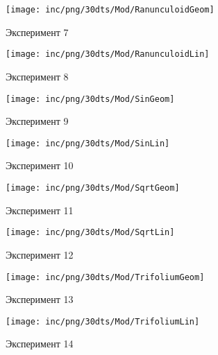 \begin{figure}  
	\begin{minipage}{0,5\textwidth}
		\texttt{[image: inc/png/30dts/Mod/RanunculoidGeom]}
		\label{fig:app1}
		\caption{Эксперимент 7}
	\end{minipage}
	\begin{minipage}{0,5\textwidth}
		\texttt{[image: inc/png/30dts/Mod/RanunculoidLin]}
		\label{fig:app2}
		\caption{Эксперимент 8}
	\end{minipage}
	
	\begin{minipage}{0,5\textwidth}
		\texttt{[image: inc/png/30dts/Mod/SinGeom]}
		\label{fig:app1}
		\caption{Эксперимент 9}
	\end{minipage}
	\begin{minipage}{0,5\textwidth}
		\texttt{[image: inc/png/30dts/Mod/SinLin]}
		\label{fig:app2}
		\caption{Эксперимент 10}
	\end{minipage}
	
	\begin{minipage}{0,5\textwidth}
		\texttt{[image: inc/png/30dts/Mod/SqrtGeom]}
		\label{fig:app1}
		\caption{Эксперимент 11}
	\end{minipage}
	\begin{minipage}{0,5\textwidth}
		\texttt{[image: inc/png/30dts/Mod/SqrtLin]}
		\label{fig:app2}
		\caption{Эксперимент 12}
	\end{minipage}
	
	\begin{minipage}{0,5\textwidth}
		\texttt{[image: inc/png/30dts/Mod/TrifoliumGeom]}
		\label{fig:app1}
		\caption{Эксперимент 13}
	\end{minipage}
	\begin{minipage}{0,5\textwidth}
		\texttt{[image: inc/png/30dts/Mod/TrifoliumLin]}
		\label{fig:app2}
		\caption{Эксперимент 14}
	\end{minipage}
\end{figure}
\clearpage


